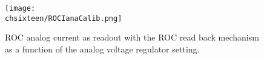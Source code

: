 \begin{figure}[!htb]
 \begin{center}
  \texttt{[image: \\chsixteen/ROCIanaCalib.png]}
 \end{center}
 \caption{ROC analog current as readout with the ROC read back mechanism as a function of the analog voltage regulator setting.}
 \label{fig:ROCIanaCalib}
\end{figure} 


